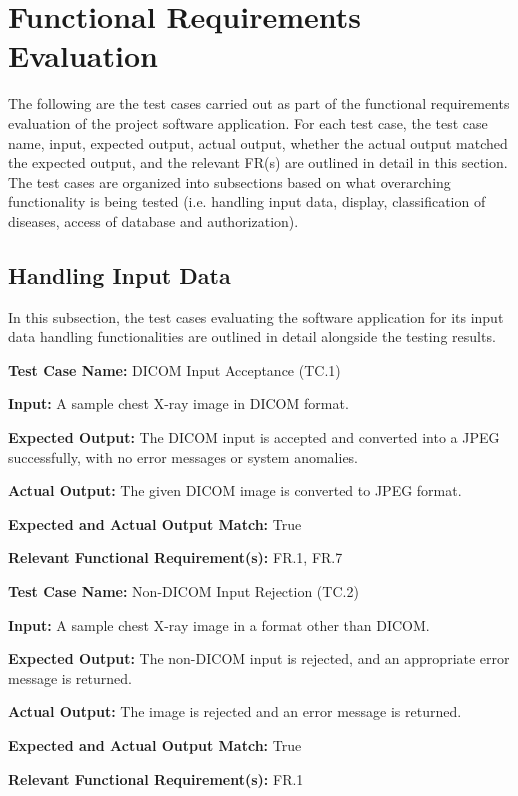 \documentclass[12pt, titlepage]{article}
\begin{document}
\section{Functional Requirements Evaluation}
The following are the test cases carried out as part of the functional requirements evaluation of the project software application. For each test case, the test case name, input, expected output, actual output, whether the actual output matched the expected output, and the relevant FR(s) are outlined in detail in this section. The test cases are organized into subsections based on what overarching functionality is being tested (i.e. handling input data, display, classification of diseases, access of database and authorization).

\subsection{Handling Input Data}
In this subsection, the test cases evaluating the software application for its input data handling functionalities are outlined in detail alongside the testing results. \\

\begin{mdframed}[linewidth=0.5mm]
  \textbf{Test Case Name:} DICOM Input Acceptance (TC.1) \par
  \textbf{Input:} A sample chest X-ray image in DICOM format. \par
  \textbf{Expected Output:} The DICOM input is accepted and converted into a JPEG successfully, with no error messages or system anomalies. \par
  \textbf{Actual Output:} The given DICOM image is converted to JPEG format. \par
  \textbf{Expected and Actual Output Match:} True \par
  \textbf{Relevant Functional Requirement(s):} FR.1, FR.7
\end{mdframed}

\begin{mdframed}[linewidth=0.5mm]
  \textbf{Test Case Name:} Non-DICOM Input Rejection (TC.2) \par
  \textbf{Input:} A sample chest X-ray image in a format other than DICOM. \par
  \textbf{Expected Output:} The non-DICOM input is rejected, and an appropriate error message is returned. \par
  \textbf{Actual Output:} The image is rejected and an error message is returned. \par
  \textbf{Expected and Actual Output Match:} True \par
  \textbf{Relevant Functional Requirement(s):} FR.1
\end{mdframed}
\end{document}
